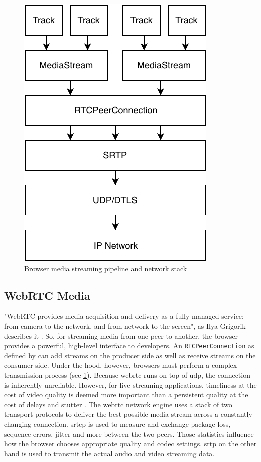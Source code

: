 \begin{figure}
\centering
\includegraphics[width=.5\textwidth]{graphics/media-stream-pipeline.pdf}
\caption{Browser media streaming pipeline and network stack}
\label{fig:pipeline}
\end{figure}

\subsection{WebRTC Media}
\label{subsec:webrtc-media}

"WebRTC provides media acquisition and delivery as a fully managed service: from camera to the network, and from network to the screen", as Ilya Grigorik describes it \cite[\S18.5]{high-performance-browser-networking}. So, for streaming media from one peer to another, the browser provides a powerful, high-level interface to developers. An \lstinline|RTCPeerConnection| as defined by \cite[\S4.4]{webrtc-w3c} can add streams on the producer side as well as receive streams on the consumer side. Under the hood, however, browsers must perform a complex transmission process (see \cref{fig:pipeline}). Because \gls{webrtc} runs on top of \gls{udp}, the connection is inherently unreliable. However, for live streaming applications, timeliness at the cost of video quality is deemed more important than a persistent quality at the cost of delays and stutter \cite[\S18.3]{high-performance-browser-networking}. The \gls{webrtc} network engine uses a stack of two transport protocols to deliver the best possible media stream across a constantly changing connection. \Gls{srtcp} is used to measure and exchange package loss, sequence errors, jitter and more between the two peers. Those statistics influence how the browser chooses appropriate quality and codec settings. \gls{srtp} on the other hand is used to transmit the actual audio and video streaming data.

